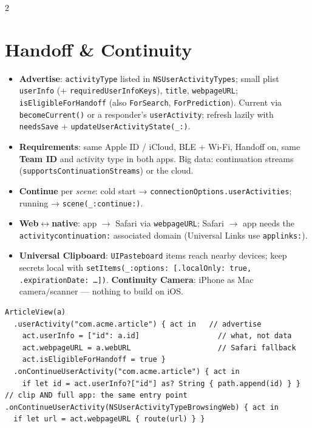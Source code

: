\documentclass[8pt]{extarticle}
\begin{document}
\begin{multicols}{2}
\section{Handoff \& Continuity}
\begin{itemize}
  \item \textbf{Advertise}: \texttt{activityType} listed in \texttt{NSUserActivityTypes}; small plist \texttt{userInfo}
        (+ \texttt{requiredUserInfoKeys}), \texttt{title}, \texttt{webpageURL}; \texttt{isEligibleForHandoff} (also
        \texttt{ForSearch}, \texttt{ForPrediction}). Current via \texttt{becomeCurrent()} or a responder's
        \texttt{userActivity}; refresh lazily with \texttt{needsSave} + \texttt{updateUserActivityState(\_:)}.
  \item \textbf{Requirements}: same Apple ID / iCloud, BLE + Wi-Fi, Handoff on, same \textbf{Team ID} and activity type
        in both apps. Big data: continuation streams (\texttt{supportsContinuationStreams}) or the cloud.
  \item \textbf{Continue} per \emph{scene}: cold start → \texttt{connectionOptions.userActivities}; running →
        \texttt{scene(\_:continue:)}.
  \item \textbf{Web$\leftrightarrow$native}: app $\to$ Safari via \texttt{webpageURL}; Safari $\to$ app needs the
        \texttt{activitycontinuation:} associated domain (Universal Links use \texttt{applinks:}).
  \item \textbf{Universal Clipboard}: \texttt{UIPasteboard} items reach nearby devices; keep secrets local with
        \texttt{setItems(\_:options: [.localOnly: true, .expirationDate: …])}.
        \textbf{Continuity Camera}: iPhone as Mac camera/scanner — nothing to build on iOS.
\end{itemize}

\columnbreak

\begin{lstlisting}[language=SwiftSheet]
ArticleView(a)
  .userActivity("com.acme.article") { act in   // advertise
    act.userInfo = ["id": a.id]                  // what, not data
    act.webpageURL = a.webURL                    // Safari fallback
    act.isEligibleForHandoff = true }
  .onContinueUserActivity("com.acme.article") { act in
    if let id = act.userInfo?["id"] as? String { path.append(id) } }
// clip AND full app: the same entry point
.onContinueUserActivity(NSUserActivityTypeBrowsingWeb) { act in
  if let url = act.webpageURL { route(url) } }
\end{lstlisting}


\end{multicols}
\end{document}

